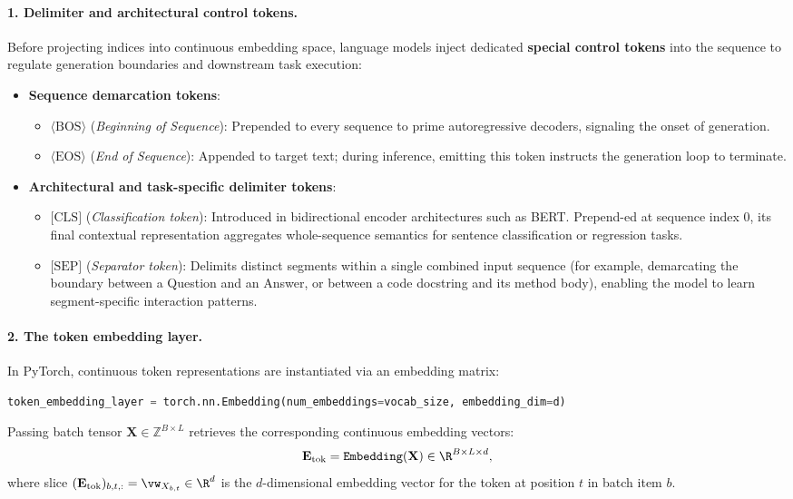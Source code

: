 \documentclass[../../main.tex]{subfiles}
\begin{document}
\paragraph{1. Delimiter and architectural control tokens.}
Before projecting indices into continuous embedding space, language models inject dedicated \textbf{special control tokens} into the sequence to regulate generation boundaries and downstream task execution:
\begin{itemize}
    \item \textbf{Sequence demarcation tokens}:
    \begin{itemize}
        \item $\langle\text{BOS}\rangle$ (\emph{Beginning of Sequence}): Prepended to every sequence to prime autoregressive decoders, signaling the onset of generation.
        \item $\langle\text{EOS}\rangle$ (\emph{End of Sequence}): Appended to target text; during inference, emitting this token instructs the generation loop to terminate.
    \end{itemize}
    \item \textbf{Architectural and task-specific delimiter tokens}:
    \begin{itemize}
        \item $\text{[CLS]}$ (\emph{Classification token}): Introduced in bidirectional encoder architectures such as BERT. Prepend-ed at sequence index $0$, its final contextual representation aggregates whole-sequence semantics for sentence classification or regression tasks.
        \item $\text{[SEP]}$ (\emph{Separator token}): Delimits distinct segments within a single combined input sequence (for example, demarcating the boundary between a Question and an Answer, or between a code docstring and its method body), enabling the model to learn segment-specific interaction patterns.
    \end{itemize}
\end{itemize}

\paragraph{2. The token embedding layer.}
In PyTorch, continuous token representations are instantiated via an embedding matrix:
\begin{lstlisting}[language=Python]
token_embedding_layer = torch.nn.Embedding(num_embeddings=vocab_size, embedding_dim=d)
\end{lstlisting}
Passing batch tensor $\mathbf{X} \in \mathbb{Z}^{B \times L}$ retrieves the corresponding continuous embedding vectors:
\begin{equation}
\label{eq:token_embedding_lookup_batch}
\mathbf{E}_{\text{tok}} = \text{\texttt{Embedding}}(\mathbf{X}) \in \R^{B \times L \times d},
\end{equation}
where slice $(\mathbf{E}_{\text{tok}})_{b, t, :} = \vw_{X_{b, t}} \in \R^d$ is the $d$-dimensional embedding vector for the token at position $t$ in batch item $b$.
\end{document}

